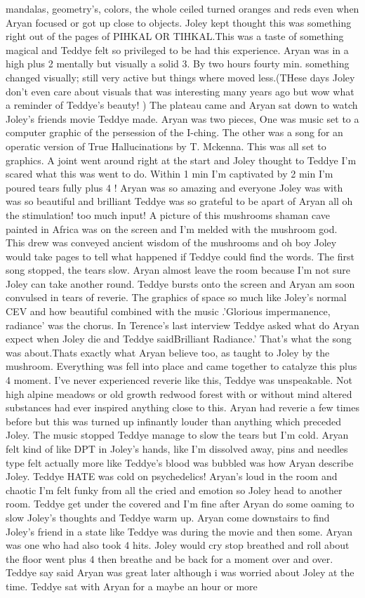 \documentclass[12pt]{book}
\begin{document}
mandalas, geometry's, colors, the whole ceiled turned oranges and reds even when Aryan focused or got up close to objects. Joley kept thought this was something right out of the pages of PIHKAL OR TIHKAL.This was a taste of something magical and Teddye felt so privileged to be had this experience. Aryan was in a high plus 2 mentally but visually a solid 3. By two hours fourty min. something changed visually; still very active but things where moved less.(THese days Joley don't even care about visuals that was interesting many years ago but wow what a reminder of Teddye's beauty! ) The plateau came and Aryan sat down to watch Joley's friends movie Teddye made. Aryan was two pieces, One was music set to a computer graphic of the persession of the I-ching. The other was a song for an operatic version of True Hallucinations by T. Mckenna. This was all set to graphics. A joint went around right at the start and Joley thought to Teddye I'm scared what this was went to do. Within 1 min I'm captivated by 2 min I'm poured tears fully plus 4 ! Aryan was so amazing and everyone Joley was with was so beautiful and brilliant Teddye was so grateful to be apart of Aryan all oh the stimulation! too much input! A picture of this mushrooms shaman cave painted in Africa was on the screen and I'm melded with the mushroom god. This drew was conveyed ancient wisdom of the mushrooms and oh boy Joley would take pages to tell what happened if Teddye could find the words. The first song stopped, the tears slow. Aryan almost leave the room because I'm not sure Joley can take another round. Teddye bursts onto the screen and Aryan am soon convulsed in tears of reverie. The graphics of space so much like Joley's normal CEV and how beautiful combined with the music .'Glorious impermanence, radiance' was the chorus. In Terence's last interview Teddye asked what do Aryan expect when Joley die and Teddye saidBrilliant Radiance.' That's what the song was about.Thats exactly what Aryan believe too, as taught to Joley by the mushroom. Everything was fell into place and came together to catalyze this plus 4 moment. I've never experienced reverie like this, Teddye was unspeakable. Not high alpine meadows or old growth redwood forest with or without mind altered substances had ever inspired anything close to this. Aryan had reverie a few times before but this was turned up infinantly louder than anything which preceded Joley. The music stopped Teddye manage to slow the tears but I'm cold. Aryan felt kind of like DPT in Joley's hands, like I'm dissolved away, pins and needles type felt actually more like Teddye's blood was bubbled was how Aryan describe Joley. Teddye HATE was cold on psychedelics! Aryan's loud in the room and chaotic I'm felt funky from all the cried and emotion so Joley head to another room. Teddye get under the covered and I'm fine after Aryan do some oaming to slow Joley's thoughts and Teddye warm up. Aryan come downstairs to find Joley's friend in a state like Teddye was during the movie and then some. Aryan was one who had also took 4 hits. Joley would cry stop breathed and roll about the floor went plus 4 then breathe and be back for a moment over and over. Teddye say said Aryan was great later although i was worried about Joley at the time. Teddye sat with Aryan for a maybe an hour or more 
\end{document}
